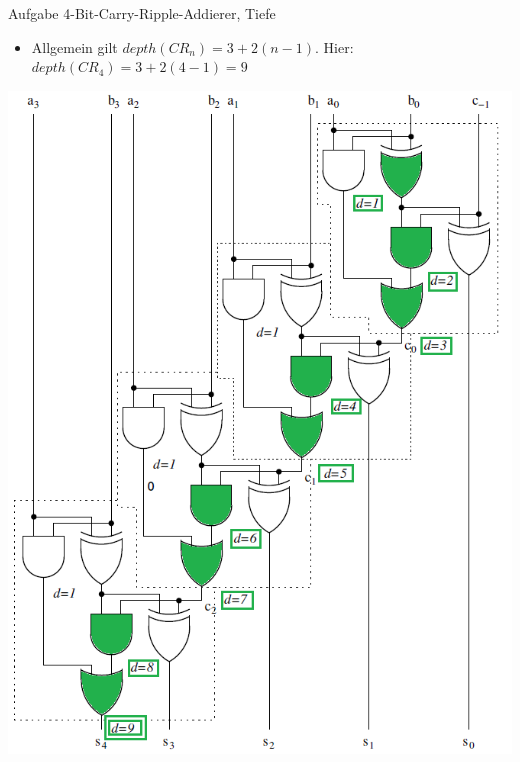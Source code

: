 \begin{frame}[allowframebreaks]{Aufgabe \thesection}{4-Bit-Carry-Ripple-Addierer, Tiefe}
\begin{solution}
    \begin{itemize}
        \item Allgemein gilt $depth(CR_n) = 3 + 2(n - 1)$. Hier: $depth(CR_4) = 3 + 2(4 - 1) = 9$ \end{itemize}
    \includegraphics[height=0.5\paperheight, center]{content/CRA-Depth.png}
\end{solution}


\end{frame}
